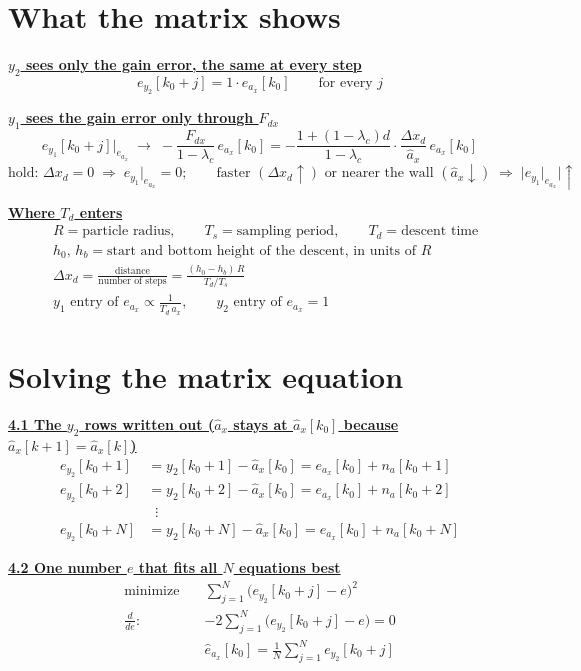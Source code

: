 \documentclass[11pt,a4paper]{ctexart}
\newcommand{\lc}{\lambda_c}
\newcommand{\hd}[1]{\par\bigskip\noindent\underline{\textbf{#1}}}
\begin{document}
\section{What the matrix shows}

\hd{$y_2$ sees only the gain error, the same at every step}
\[
e_{y_2}[k_0+j] = 1\cdot e_{a_x}[k_0] \qquad \text{for every } j
\]

\hd{$y_1$ sees the gain error only through $F_{dx}$}
\[
e_{y_1}[k_0+j]\Big|_{e_{a_x}} \;\to\; -\frac{F_{dx}}{1-\lc}\,e_{a_x}[k_0]
= -\frac{1 + (1-\lc)d}{1-\lc}\cdot\frac{\Delta x_d}{\hat a_x}\,e_{a_x}[k_0]
\]
\[
\text{hold: } \Delta x_d = 0 \;\Rightarrow\; e_{y_1}\Big|_{e_{a_x}} = 0; \qquad
\text{faster } (\Delta x_d \uparrow) \text{ or nearer the wall } (\hat a_x \downarrow) \;\Rightarrow\; \Big|e_{y_1}\big|_{e_{a_x}}\Big| \uparrow
\]

\hd{Where $T_d$ enters}
\[
\begin{aligned}
&R = \text{particle radius}, \qquad T_s = \text{sampling period}, \qquad T_d = \text{descent time} \\
&h_0,\, h_b = \text{start and bottom height of the descent, in units of } R \\
&\Delta x_d = \frac{\text{distance}}{\text{number of steps}} = \frac{(h_0 - h_b)\,R}{T_d / T_s} \\
&y_1 \text{ entry of } e_{a_x} \propto \frac{1}{T_d\,\hat a_x}, \qquad y_2 \text{ entry of } e_{a_x} = 1
\end{aligned}
\]

\clearpage
\section{Solving the matrix equation}

\hd{4.1 The $y_2$ rows written out ($\hat a_x$ stays at $\hat a_x[k_0]$ because $\hat a_x[k+1] = \hat a_x[k]$)}
\[
\begin{aligned}
e_{y_2}[k_0+1] &= y_2[k_0+1] - \hat a_x[k_0] = e_{a_x}[k_0] + n_a[k_0+1] \\
e_{y_2}[k_0+2] &= y_2[k_0+2] - \hat a_x[k_0] = e_{a_x}[k_0] + n_a[k_0+2] \\
&\;\;\vdots \\
e_{y_2}[k_0+N] &= y_2[k_0+N] - \hat a_x[k_0] = e_{a_x}[k_0] + n_a[k_0+N]
\end{aligned}
\]

\hd{4.2 One number $e$ that fits all $N$ equations best}
\[
\begin{aligned}
\text{minimize}\quad & \sum_{j=1}^{N}\big(e_{y_2}[k_0+j] - e\big)^2 \\
\frac{d}{de}:\quad & -2\sum_{j=1}^{N}\big(e_{y_2}[k_0+j] - e\big) = 0 \\
& \hat e_{a_x}[k_0] = \frac{1}{N}\sum_{j=1}^{N} e_{y_2}[k_0+j]
\end{aligned}
\]
\end{document}
